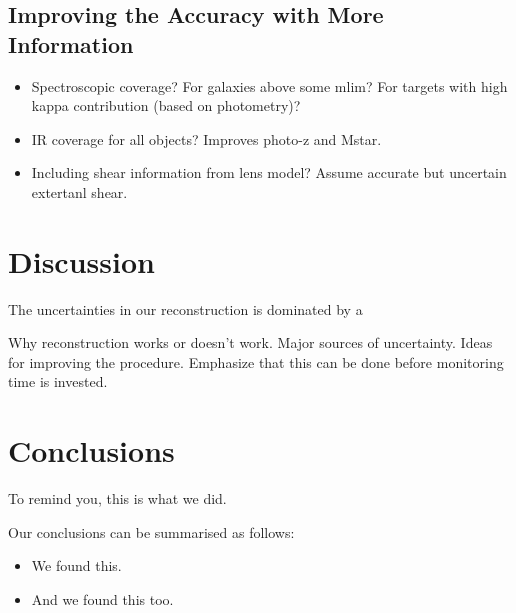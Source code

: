\documentclass[useAMS,usenatbib]{mn2e}
\begin{document}
{%

\subsection{Improving the Accuracy with More Information}
\label{sec:Dt:selection} 

\begin{itemize}
\item Spectroscopic coverage? For galaxies above some mlim? For targets with
high kappa contribution (based on photometry)?
\item IR coverage for all objects? Improves photo-z and Mstar.
\item Including shear information from lens model? Assume accurate but
uncertain extertanl shear.
\end{itemize}



}

\section{Discussion}
\label{sec:discuss}


The uncertainties in our reconstruction is dominated by a 



Why reconstruction works or doesn't work.
Major sources of uncertainty.
Ideas for improving the procedure.
Emphasize that this can be done before monitoring time is invested.


\section{Conclusions}
\label{sec:conclude}

To remind you, this is what we did.

Our conclusions can be summarised as follows:

\begin{itemize}

\item We found this.

\item And we found this too.

\end{itemize}
\end{document}
